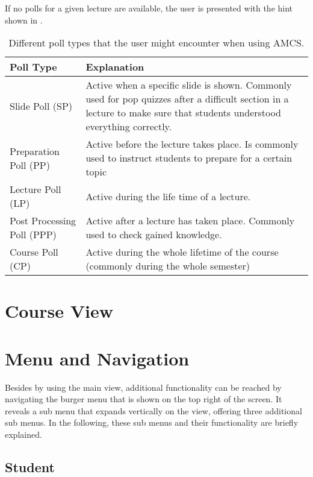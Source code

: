 If no polls for a given lecture are available, the user is presented with the hint shown in \todogrf.

\begin{table}[t]
	{\renewcommand{\arraystretch}{2}
		\begin{tabular}{ | p{3cm} | p{12cm} |}
			\hline
			Poll Type & Explanation \\ \hline \hline
			Slide Poll (SP) & Active when a specific slide is shown. Commonly used for pop quizzes after a difficult section in a lecture to make sure that students understood everything correctly. \\ \hline
			Preparation Poll (PP) & Active before the lecture takes place. Is commonly used to instruct students to prepare for a certain topic \\ \hline
			Lecture Poll (LP) & Active during the life time of a lecture. \\ \hline
			Post Processing Poll (PPP) & Active after a lecture has taken place. Commonly used to check gained knowledge. \\ \hline
			Course Poll (CP) & Active during the whole lifetime of the course (commonly during the whole semester) \\
			\hline
		\end{tabular}
	}
	\caption{Different poll types that the user might encounter when using AMCS.}
	\label{tab:pollTypes}
\end{table}

\section{Course View}

\section{Menu and Navigation}
Besides by using the main view, additional functionality can be reached by navigating the burger menu that is shown on the top right of the screen. It reveals a sub menu that expands vertically on the view, offering three additional sub menus. In the following, these sub menus and their functionality are briefly explained.

\subsection{Student}

